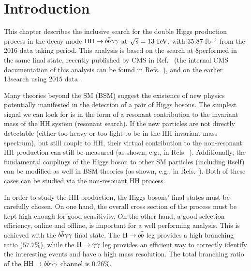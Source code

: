 \section{Introduction}
This chapter describes the inclusive search for the double Higgs production process in the decay
mode $\mathrm{H}\mathrm{H} \to b\bar{b}\gamma\gamma $ at $\sqrt{s}=13\,\text{Te\hspace{-.08em}V}$, with $35.87$ fb$^{-1}$ from the 2016 data taking period. 
This analysis is based on the search at 8\TeV performed in the same final state, recently published by CMS in
Ref.~\cite{HIG-13-032} (the internal CMS documentation of this analysis can be found in Refs.~\cite{AN-13-075,AN-14-118}), and 
on the earlier 13\TeV search using 2015 data \cite{bbgg_2015}.

Many theories beyond the SM (BSM) suggest the existence of new physics potentially manifested in the detection of a pair of Higgs bosons. 
The simplest signal we can look for is in the form of a resonant contribution to the invariant mass of the HH system (resonant search). 
If the new particles are not directly detectable (either too heavy or too light to be in the HH invariant mass spectrum), but still couple to HH, their virtual contribution to the non-resonant HH production can still be measured (as shown, e.g., in Refs.~\cite{Dawson:2015oha,Cao:2013si}). Additionally, the fundamental couplings of the Higgs boson to other SM particles (including itself) can be modified as well in BSM theories (as shown, e.g., in Refs.~\cite{Mangano:2002ea,Grober:2015cwa}). Both of these cases can be studied via the non-resonant HH process.

In order to study the HH production, the Higgs bosons' final states must be carefully chosen. On one hand, the overall cross section of the process must be kept high enough for good sensitivity. On the other hand, a good selection efficiency, online and offline, is important for a well performing analysis. This is achieved with the $b\bar{b}\gamma\gamma $ final state. The $\mathrm{H}\to b\bar{b}$ leg provides a high branching ratio ($57.7\%$), while the $\mathrm{H}\to\gamma\gamma$ leg provides an efficient way to correctly identify the interesting events and have a high mass resolution. The total branching ratio of the $\mathrm{H}\mathrm{H}\to b\bar{b}\gamma\gamma $  channel is $0.26\%$.



